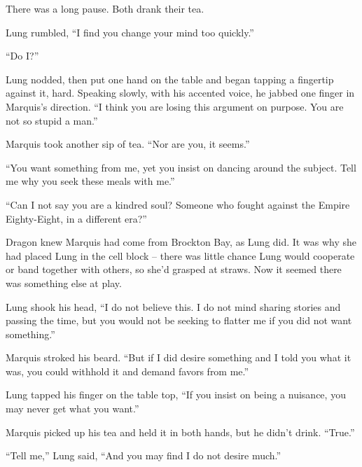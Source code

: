 There was a long pause.  Both drank their tea.



Lung rumbled, ``I find you change your mind too quickly.''



``Do I?''



Lung nodded, then put one hand on the table and began tapping a fingertip against it, hard.  Speaking slowly, with his accented voice, he jabbed one finger in Marquis's direction.  ``I think you are losing this argument on purpose.  You are not so stupid a man.''



Marquis took another sip of tea.  ``Nor are you, it seems.''



``You want something from me, yet you insist on dancing around the subject.  Tell me why you seek these meals with me.''



``Can I not say you are a kindred soul?  Someone who fought against the Empire Eighty-Eight, in a different era?''



Dragon knew Marquis had come from Brockton Bay, as Lung did.  It was why she had placed Lung in the cell block – there was little chance Lung would cooperate or band together with others, so she'd grasped at straws.  Now it seemed there was something else at play.



Lung shook his head, ``I do not believe this.  I do not mind sharing stories and passing the time, but you would not be seeking to flatter me if you did not want something.''



Marquis stroked his beard.  ``But if I did desire something and I told you what it was, you could withhold it and demand favors from me.''



Lung tapped his finger on the table top, ``If you insist on being a nuisance, you may never get what you want.''



Marquis picked up his tea and held it in both hands, but he didn't drink.  ``True.''



``Tell me,'' Lung said, ``And you may find I do not desire much.''



